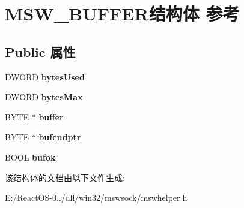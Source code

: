 \hypertarget{struct_m_s_w___b_u_f_f_e_r}{}\section{M\+S\+W\+\_\+\+B\+U\+F\+F\+E\+R结构体 参考}
\label{struct_m_s_w___b_u_f_f_e_r}
\subsection*{Public 属性}
\begin{DoxyCompactItemize}
\item 
\mbox{\label{struct_m_s_w___b_u_f_f_e_r_a50e2e4c73b6249884301156a9af9d660}} 
D\+W\+O\+RD {\bfseries bytes\+Used}
\item 
\mbox{\label{struct_m_s_w___b_u_f_f_e_r_a9eb5d58134fd0d1e1a95db0a7253bb08}} 
D\+W\+O\+RD {\bfseries bytes\+Max}
\item 
\mbox{\label{struct_m_s_w___b_u_f_f_e_r_ae4a33132e040416828df76371dd67f36}} 
B\+Y\+TE $\ast$ {\bfseries buffer}
\item 
\mbox{\label{struct_m_s_w___b_u_f_f_e_r_abb6c099470dd26e15df009596746923d}} 
B\+Y\+TE $\ast$ {\bfseries bufendptr}
\item 
\mbox{\label{struct_m_s_w___b_u_f_f_e_r_a2e3a4e33b35158e3383b005adfe03e3a}} 
B\+O\+OL {\bfseries bufok}
\end{DoxyCompactItemize}


该结构体的文档由以下文件生成\+:\begin{DoxyCompactItemize}
\item 
E\+:/\+React\+O\+S-\/0../dll/win32/mswsock/mswhelper.\+h\end{DoxyCompactItemize}
